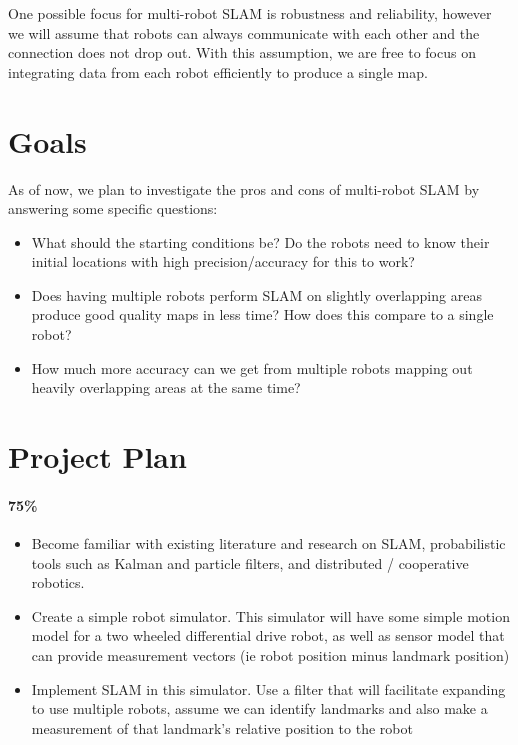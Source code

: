 \documentclass[11pt]{article}
\begin{document}
One possible focus for multi-robot SLAM is robustness and reliability, however we will assume that robots can always communicate with each other and the connection does not drop out. With this assumption, we are free to focus on integrating data from each robot efficiently to produce a single map.

\section{Goals}

As of now, we plan to investigate the pros and cons of multi-robot SLAM by answering some specific questions:

\begin{itemize}
    \item What should the starting conditions be? Do the robots need to know their initial locations with high precision/accuracy for this to work?
    \item Does having multiple robots perform SLAM on slightly overlapping areas produce good quality maps in less time? How does this compare to a single robot?
    \item How much more accuracy can we get from multiple robots mapping out heavily overlapping areas at the same time?
\end{itemize}

\section*{Project Plan}

\paragraph{75\%}
\begin{itemize}
    \item Become familiar with existing literature and research on SLAM, probabilistic tools such as Kalman and particle filters, and distributed / cooperative robotics.
    \item Create a simple robot simulator. This simulator will have some simple motion model for a two wheeled differential drive robot, as well as sensor model that can provide measurement vectors (ie robot position minus landmark position)
    \item Implement SLAM in this simulator. Use a filter that will facilitate expanding to use multiple robots, assume we can identify landmarks and also make a measurement of that landmark's relative position to the robot
\end{itemize}
\end{document}

